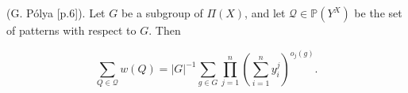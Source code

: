 (G. Pólya [p.6]). Let $G$ be a subgroup of $\Pi(X)$, and let $\mathcal{Q} \in \mathbb{P}(Y^X)$ be the set of patterns with respect to $G$. Then

$$\sum_{Q \in \mathcal{Q}} w(Q) = |G|^{-1} \sum_{g \in G} \prod_{j=1}^{n} \left( \sum_{i=1}^{n} y_i^j \right)^{o_j(g)}.$$
